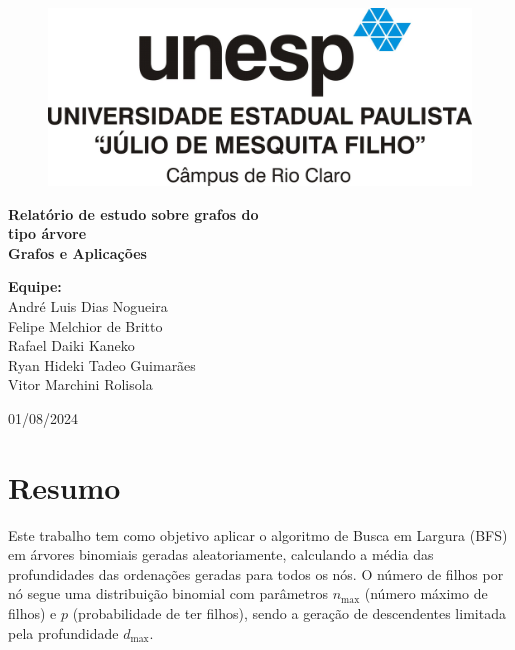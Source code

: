 \documentclass[12pt, a4paper]{scrreprt}
\begin{document}
\begin{titlepage}
    \centering
    \begin{figure}[h]
        \centering
        \includegraphics[width=.75\textwidth]{src/logo_unesp.jpg}
        \label{fig:logo_unesp}
    \end{figure}
    \vfill
    \Huge\textbf{Relatório de estudo sobre grafos do \\ tipo árvore}\\[1.5cm]
    \Large\textbf{Grafos e Aplicações}\\[1.5cm]
    \vfill
    \begin{flushleft}
        \textbf{Equipe:}\\
        \hspace{1.5cm}André Luis Dias Nogueira \\ 
        \hspace{1.5cm}Felipe Melchior de Britto \\
        \hspace{1.5cm}Rafael Daiki Kaneko \\
        \hspace{1.5cm}Ryan Hideki Tadeo Guimarães \\
        \hspace{1.5cm}Vitor Marchini Rolisola \\
    \end{flushleft}
    \vfill
    01/08/2024\\
\end{titlepage}

\tableofcontents
\newpage

\chapter{Resumo}

Este trabalho tem como objetivo aplicar o algoritmo de Busca em Largura (BFS) em árvores binomiais geradas aleatoriamente, calculando a média das profundidades das ordenações geradas para todos os nós. O número de filhos por nó segue uma distribuição binomial com parâmetros \( n_{\text{max}} \) (número máximo de filhos) e \( p\) (probabilidade de ter filhos), sendo a geração de descendentes limitada pela profundidade \( d_{\text{max}} \).
\end{document}
